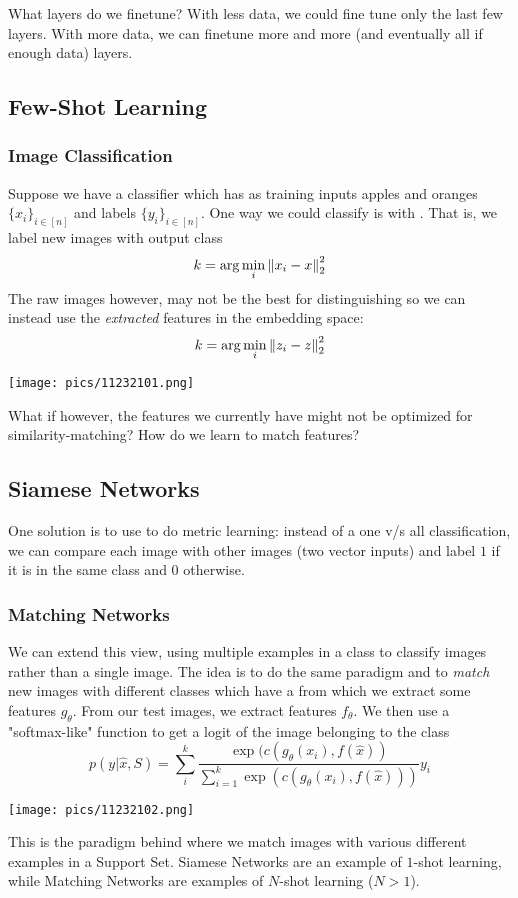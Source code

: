 \documentclass[11pt]{scrartcl}
\begin{document}
What layers do we finetune? With less data, we could fine tune only the last few layers. With more data, we can finetune more and more (and eventually all if enough data) layers. 

\subsection{Few-Shot Learning}
\subsubsection{Image Classification}

Suppose we have a classifier which has as training inputs apples and oranges $\{x_i\}_{i \in [n]}$ and labels $\{y_i\}_{i \in [n]}$. One way we could classify is with . That is, we label new images with output class 
$$k=\arg\min_{i}\left\lVert x_i-x\right\rVert_2^2$$
The raw images however, may not be the best for distinguishing so we can instead use the \textit{extracted} features in the embedding space:
$$k=\arg\min_{i}\left\lVert z_i-z\right\rVert_{2}^{2}$$
\begin{center}
    \texttt{[image: pics/11232101.png]}
\end{center}
What if however, the features we currently have might not be optimized for similarity-matching? How do we learn to match features? 

\subsection{Siamese Networks}
One solution is to use  to do metric learning: instead of a one v/s all classification, we can compare each 
image with other images (two vector inputs) and label $1$ if it is in the same class and $0$ otherwise.

\subsubsection{Matching Networks}
We can extend this view, using multiple examples in a class to classify images rather than a single image. The idea is to do the same paradigm and to \textit{match} new images with different classes which have a  from which we extract some features $g_\theta$. From our test images, we extract features $f_\theta$. We then use a "softmax-like" function to get a logit of the image belonging to the class
$$p(y|\hat{x},S)=\sum_{i}^{k}\frac{\exp(c(g_\theta(x_i),f(\hat{x}))}{\sum_{i=1}^{k}\exp(c(g_\theta(x_i),f(\hat{x})))}y_i$$
\begin{center}
    \texttt{[image: pics/11232102.png]}
\end{center}
This is the paradigm behind  where we match images with various different examples in a Support Set. Siamese Networks are an example of $1$-shot learning, while Matching Networks are examples of $N$-shot learning ($N>1$). 
\end{document}
